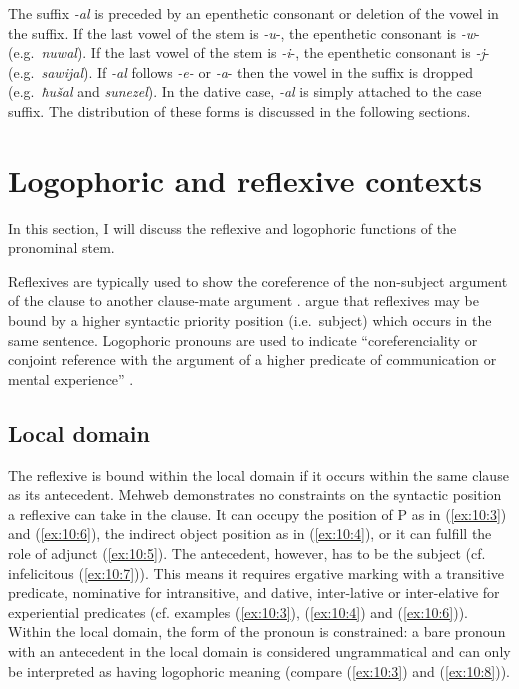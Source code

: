 ﻿\documentclass[output=paper]{langsci/langscibook}
\begin{document}
The suffix \emph{-al} is preceded by an epenthetic consonant or deletion
of the vowel in the suffix. If the last vowel of the stem is \emph{-u}-,
the epenthetic consonant is \emph{-w}- (e.g.\ \emph{nuwal}). If the last
vowel of the stem is \emph{-i}-, the epenthetic consonant is \emph{-j}-
(e.g.\ \emph{sawijal}). If \emph{-al} follows \emph{-e-} or \emph{-a}-
then the vowel in the suffix is dropped (e.g.\ \emph{ħušal} and
\emph{sunezel}). In the dative case, \emph{-al} is simply attached to
the case suffix. The distribution of these forms is discussed in the
following sections.

\section{Logophoric and reflexive contexts}\label{logophoric-and-reflexive-contexts}


In this section, I will discuss the reflexive and logophoric functions of
the pronominal stem.

Reflexives are typically used to show the coreference of the non-subject
argument of the clause to another clause-mate argument \citep{könig-etal2013}.
\citet{testelets-toldova1998} argue that reflexives may be bound by a
higher syntactic priority position (i.e.\ subject) which occurs in the
same sentence. Logophoric pronouns are used to indicate
``coreferenciality or conjoint reference with the argument of a higher
predicate of communication or mental experience'' \citep{sells1987}.
{\par}

\subsection{Local domain}


The reflexive is bound within the local domain if it occurs within the
same clause as its antecedent. Mehweb demonstrates no constraints on the
syntactic position a reflexive can take in the clause. It can occupy the
position of P as in (\ref{ex:10:3}) and (\ref{ex:10:6}), the indirect object position as in (\ref{ex:10:4}),
or it can fulfill the role of adjunct (\ref{ex:10:5}). The antecedent, however, has
to be the subject (cf. infelicitous (\ref{ex:10:7})). This means it requires
ergative marking with a transitive predicate, nominative for
intransitive, and dative, inter-lative or inter-elative for experiential
predicates (cf. examples (\ref{ex:10:3}), (\ref{ex:10:4}) and (\ref{ex:10:6})). Within the local domain, the
form of the pronoun is constrained: a bare pronoun with an antecedent in
the local domain is considered ungrammatical and can only be interpreted
as having logophoric meaning (compare (\ref{ex:10:3}) and (\ref{ex:10:8})).
\end{document}
